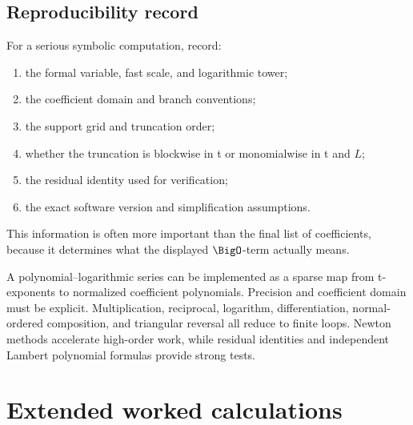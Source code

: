 \documentclass[11pt,openany]{book}
\theoremstyle{definition}
\theoremstyle{plain}
\theoremstyle{remark}
\begin{document}
\section{Reproducibility record}
For a serious symbolic computation, record:
\begin{enumerate}
\item the formal variable, fast scale, and logarithmic tower;
\item the coefficient domain and branch conventions;
\item the support grid and truncation order;
\item whether the truncation is blockwise in t or monomialwise in t and \(L\);
\item the residual identity used for verification;
\item the exact software version and simplification assumptions.
\end{enumerate}
This information is often more important than the final list of coefficients,
because it determines what the displayed \(\BigO\)-term actually means.

\begin{summarybox}
A polynomial--logarithmic series can be implemented as a sparse map from
t-exponents to normalized coefficient polynomials.  Precision and coefficient
domain must be explicit.  Multiplication, reciprocal, logarithm,
differentiation, normal-ordered composition, and triangular reversal all reduce
to finite loops.  Newton methods accelerate high-order work, while residual
identities and independent Lambert polynomial formulas provide strong tests.
\end{summarybox}

\chapter{Extended worked calculations}\label{ch:worked}
\end{document}
